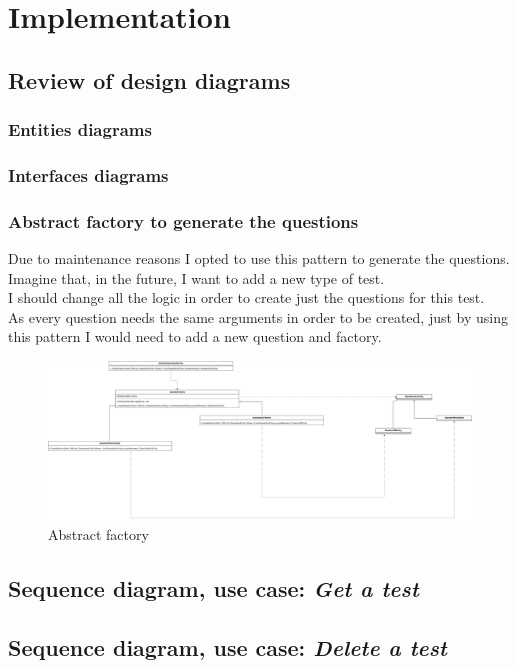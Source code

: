 \chapter{Implementation}

\section{Review of design diagrams}
    \subsection{Entities diagrams}
    \subsection{Interfaces diagrams}
    \subsection{Abstract factory to generate the questions}
    Due to maintenance reasons I opted to use this pattern to generate the questions. Imagine that, in the future, I want to add a new type of test. \\
    I should change all the logic in order to create just the questions for this test. \\
    As every question needs the same arguments in order to be created, just by using this pattern I would need to add a new question and factory. 
        \newpage
        \begin{figure}[H]
            \centering
                \includegraphics[angle=90, width=\textwidth, height=\textheight]{assets/diagrams/abstractfactory.png}
            \caption{Abstract factory}
            \label{fig:implementation_af}
        \end{figure}
\section{Sequence diagram, use case: \textit{Get a test}}
\section{Sequence diagram, use case: \textit{Delete a test}}
